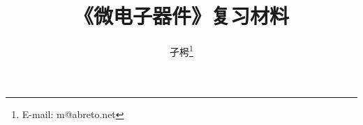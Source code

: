\documentclass[UTF8]{ctexbook}
\begin{document}
\graphicspath{{figures/}}
\title{《微电子器件》复习材料}
\author{孑枵\thanks{E-mail: m@abreto.net}}
\frontmatter
\maketitle

\tableofcontents

\mainmatter


\end{document}
